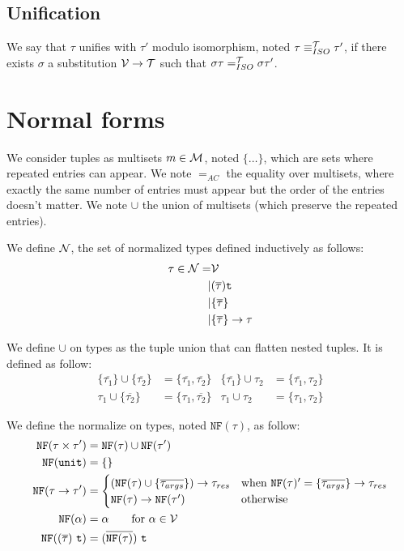 \documentclass [a4paper,11pt]{scrartcl}
\newcommand{\Var}{{\cal V}}
\newcommand{\tconstr}{\texttt{t}}
\newcommand{\T}{{\cal T}}
\newcommand{\N}{{\cal N}}
\newcommand{\MSet}{{\cal M}}
\newcommand\tprod{\times}
\newcommand\tlist{\overline}
\newcommand\tmset[1]{\{\overline{#1}\}}
\begin{document}
\subsection{Unification}

\newcommand\unifT{\equiv^{\T}_{ISO}}

We say that $\tau$ unifies with $\tau'$ modulo isomorphism, noted $\tau \unifT \tau'$, if there exists $\sigma$ a substitution $\Var \to \T$ such that $\sigma\tau \eqT \sigma\tau'$.

\section{Normal forms}

\newcommand\eqAC{=_{AC}}
\newcommand\nf[1]{\texttt{NF}(#1)}

We consider tuples as multisets $m \in \MSet$, noted $\{\dots\}$,
which are sets where repeated entries can appear.
We note $\eqAC$ the equality over multisets, where exactly
the same number of entries must appear but the order of the entries doesn't matter.
We note $\cup$ the union of multisets (which preserve the repeated entries).

We define $\N$, the set of normalized types defined
inductively as follows:
\begin{align*}
  \tau \in \N
  =& \Var\\
  |& (\tlist\tau) \tconstr\\
  |& \tmset\tau\\
  |& \tmset\tau \to \tau
\end{align*}

We define $\cup$ on types as the tuple union that can flatten
nested tuples. It is defined as follow:
\begin{align*}
  \tmset{\tau_1} \cup \tmset{\tau_2} &= \{\tlist{\tau_1},\tlist{\tau_2}\}&
  \tmset{\tau_1} \cup \tau_2 &= \{\tlist{\tau_1},\tau_2\}\\
  \tau_1 \cup \tmset{\tau_2} &= \{\tau_1,\tlist{\tau_2}\}&
  \tau_1 \cup \tau_2 &= \{\tau_1,\tau_2\}
\end{align*}


We define the normalize on types, noted $\nf\tau$, as follow:
\begin{align*}
  \nf{\tau \tprod \tau'}
  &= \nf\tau \cup \nf{\tau'}\\
  \nf{\texttt{unit}} &= \{\}\\
  \nf{\tau \to \tau'}
  &= \begin{cases}
    (\nf\tau \cup \tmset{\tau_{args}}) \to \tau_{res} & \text{when $\nf\tau' = \tmset{\tau_{args}} \to \tau_{res}$}\\
    \nf\tau \to \nf{\tau'} & \text{otherwise}    
  \end{cases} \\
  \nf{\alpha} &= \alpha \qquad\text{for }\alpha\in\Var\\
  \nf{(\tlist\tau)\ \tconstr} &= (\tlist{\nf\tau})\ \tconstr  
\end{align*}
\end{document}

